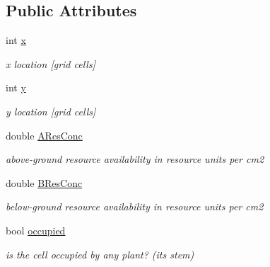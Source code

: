 \subsection*{Public Attributes}
\begin{DoxyCompactItemize}
\item 
\mbox{\label{class_c_cell_a0f4f3df4d42062241eea927a245e27c2}} 
int \mbox{\hyperlink{class_c_cell_a0f4f3df4d42062241eea927a245e27c2}{x}}
\begin{DoxyCompactList}\small\item\em x location \mbox{[}grid cells\mbox{]} \end{DoxyCompactList}\item 
\mbox{\label{class_c_cell_af60864331a2ee351332aaae53a8a760f}} 
int \mbox{\hyperlink{class_c_cell_af60864331a2ee351332aaae53a8a760f}{y}}
\begin{DoxyCompactList}\small\item\em y location \mbox{[}grid cells\mbox{]} \end{DoxyCompactList}\item 
\mbox{\label{class_c_cell_adfde4942fc0aff8308b959ef7483e81e}} 
double \mbox{\hyperlink{class_c_cell_adfde4942fc0aff8308b959ef7483e81e}{A\+Res\+Conc}}
\begin{DoxyCompactList}\small\item\em above-\/ground resource availability in resource units per cm2 \end{DoxyCompactList}\item 
\mbox{\label{class_c_cell_a1e0dc56f353fd05fae67c21424e1c341}} 
double \mbox{\hyperlink{class_c_cell_a1e0dc56f353fd05fae67c21424e1c341}{B\+Res\+Conc}}
\begin{DoxyCompactList}\small\item\em below-\/ground resource availability in resource units per cm2 \end{DoxyCompactList}\item 
\mbox{\label{class_c_cell_a7cd34f199fac6f625761f8880edf1717}} 
bool \mbox{\hyperlink{class_c_cell_a7cd34f199fac6f625761f8880edf1717}{occupied}}
\begin{DoxyCompactList}\small\item\em is the cell occupied by any plant? (its stem) \end{DoxyCompactList}\item 

\end{DoxyCompactItemize}
